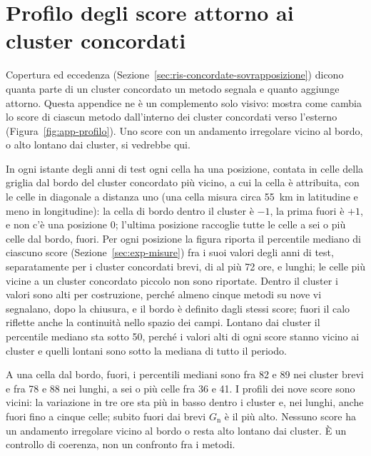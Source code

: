 \chapter{Profilo degli score attorno ai cluster concordati}
\label{app:profilo}

Copertura ed eccedenza (Sezione~\ref{sec:ris-concordate-sovrapposizione}) dicono quanta parte di un cluster concordato un metodo segnala e quanto aggiunge attorno. Questa appendice ne è un complemento solo visivo: mostra come cambia lo score di ciascun metodo dall'interno dei cluster concordati verso l'esterno (Figura~\ref{fig:app-profilo}). Uno score con un andamento irregolare vicino al bordo, o alto lontano dai cluster, si vedrebbe qui.

In ogni istante degli anni di test ogni cella ha una posizione, contata in celle della griglia dal bordo del cluster concordato più vicino, a cui la cella è attribuita, con le celle in diagonale a distanza uno (una cella misura circa 55~km in latitudine e meno in longitudine): la cella di bordo dentro il cluster è $-1$, la prima fuori è $+1$, e non c'è una posizione 0; l'ultima posizione raccoglie tutte le celle a sei o più celle dal bordo, fuori. Per ogni posizione la figura riporta il percentile mediano di ciascuno score (Sezione~\ref{sec:exp-misure}) fra i suoi valori degli anni di test, separatamente per i cluster concordati brevi, di al più 72 ore, e lunghi; le celle più vicine a un cluster concordato piccolo non sono riportate. Dentro il cluster i valori sono alti per costruzione, perché almeno cinque metodi su nove vi segnalano, dopo la chiusura, e il bordo è definito dagli stessi score; fuori il calo riflette anche la continuità nello spazio dei campi. Lontano dai cluster il percentile mediano sta sotto 50, perché i valori alti di ogni score stanno vicino ai cluster e quelli lontani sono sotto la mediana di tutto il periodo.

A una cella dal bordo, fuori, i percentili mediani sono fra 82 e 89 nei cluster brevi e fra 78 e 88 nei lunghi, a sei o più celle fra 36 e 41. I profili dei nove score sono vicini: la variazione in tre ore sta più in basso dentro i cluster e, nei lunghi, anche fuori fino a cinque celle; subito fuori dai brevi $G_{\mathrm{n}}$ è il più alto. Nessuno score ha un andamento irregolare vicino al bordo o resta alto lontano dai cluster. È un controllo di coerenza, non un confronto fra i metodi.

